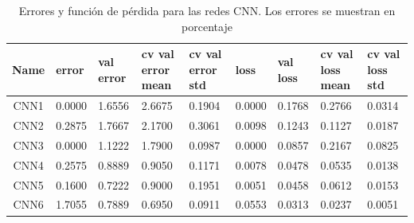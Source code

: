\documentclass[11pt]{article}
\begin{document}
\begin{table}[H]
    \centering
    \begin{tabular}{c| p{1.5cm}| p{1.5cm}| p{1.5cm}| p{1.5cm}| p{1.5cm}| p{1.5cm}| p{1.5cm}| p{1.5cm}}
        \toprule
        Name &  error &  val error &  cv val error mean &  cv val error std &   loss &  val loss &  cv val loss mean &  cv val loss std \\
        \midrule
        CNN1 & 0.0000 & 1.6556 & 2.6675 &            0.1904 & 0.0000 &    0.1768 &            0.2766 &           0.0314 \\
        CNN2 & 0.2875 & 1.7667 & 2.1700 &            0.3061 & 0.0098 &    0.1243 &            0.1127 &           0.0187 \\
        CNN3 & 0.0000 & 1.1222 & 1.7900 &            0.0987 & 0.0000 &    0.0857 &            0.2167 &           0.0825 \\
        CNN4 & 0.2575 & 0.8889 & 0.9050 &            0.1171 & 0.0078 &    0.0478 &            0.0535 &           0.0138 \\
        CNN5 & 0.1600 & 0.7222 & 0.9000 &            0.1951 & 0.0051 &    0.0458 &            0.0612 &           0.0153 \\
        CNN6 & 1.7055 & 0.7889 & 0.6950 &            0.0911 & 0.0553 &    0.0313 &            0.0237 &           0.0051 \\
        \bottomrule
        \end{tabular}
    \caption{Errores y función de pérdida para las redes CNN. Los errores se muestran en porcentaje}
    \label{tab:CNNres}        
\end{table}
\end{document}
